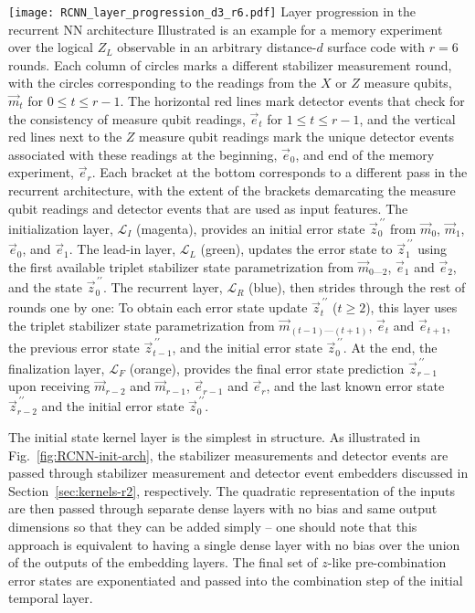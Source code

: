\begin{figure*}[htb]
\centering
\texttt{[image: RCNN\_layer\_progression\_d3\_r6.pdf]}
\ccaption
{Layer progression in the recurrent NN architecture}
{
Illustrated is an example for a memory experiment over the logical $Z_L$ observable in an arbitrary distance-$d$ surface code with $r=6$ rounds. Each column of circles marks a different stabilizer measurement round, with the circles corresponding to the readings from the $X$ or $Z$ measure qubits, $\vec{m}_t$ for $0\leq t \leq r-1$. The horizontal red lines mark detector events that check for the consistency of measure qubit readings, $\vec{e}_t$ for $1 \leq t \leq r-1$, and the vertical red lines next to the $Z$ measure qubit readings mark the unique detector events associated with these readings at the beginning, $\vec{e}_0$, and end of the memory experiment, $\vec{e}_{r}$.
Each bracket at the bottom corresponds to a different pass in the recurrent architecture, with the extent of the brackets demarcating the measure qubit readings and detector events that are used as input features.
The initialization layer, $\mathcal{L}_I$ (magenta), provides an initial error state $\vec{z}^{\,\prime\prime}_0$ from $\vec{m}_0$, $\vec{m}_1$, $\vec{e}_0$, and $\vec{e}_1$.
The lead-in layer, $\mathcal{L}_L$ (green), updates the error state to $\vec{z}^{\,\prime\prime}_1$ using the first available triplet stabilizer state parametrization from $\vec{m}_{0 \text{---} 2}$, $\vec{e}_1$ and $\vec{e}_2$, and the state $\vec{z}^{\,\prime\prime}_0$.
The recurrent layer, $\mathcal{L}_R$ (blue), then strides through the rest of rounds one by one: To obtain each error state update $\vec{z}^{\,\prime\prime}_{t}$ ($t\geq2$), this layer uses the triplet stabilizer state parametrization from $\vec{m}_{(t-1) \text{---} (t+1)}$, $\vec{e}_{t}$ and $\vec{e}_{t+1}$, the previous error state $\vec{z}^{\,\prime\prime}_{t-1}$, and the initial error state $\vec{z}^{\,\prime\prime}_{0}$.
At the end, the finalization layer, $\mathcal{L}_F$ (orange), provides the final error state prediction $\vec{z}^{\,\prime\prime}_{r-1}$ upon receiving $\vec{m}_{r-2}$ and $\vec{m}_{r-1}$, $\vec{e}_{r-1}$ and $\vec{e}_r$, and the last known error state $\vec{z}^{\,\prime\prime}_{r-2}$ and the initial error state $\vec{z}^{\,\prime\prime}_{0}$.
}
\label{fig:RCNN-layer-prog}
\end{figure*}


The initial state kernel layer is the simplest in structure. As illustrated in Fig.~\ref{fig:RCNN-init-arch}, the stabilizer measurements and detector events are passed through stabilizer measurement and detector event embedders discussed in Section~\ref{sec:kernels-r2}, respectively. The quadratic representation of the inputs are then passed through separate dense layers with no bias and same output dimensions so that they can be added simply -- one should note that this approach is equivalent to having a single dense layer with no bias over the union of the outputs of the embedding layers. The final set of $z$-like pre-combination error states are exponentiated and passed into the combination step of the initial temporal layer.


